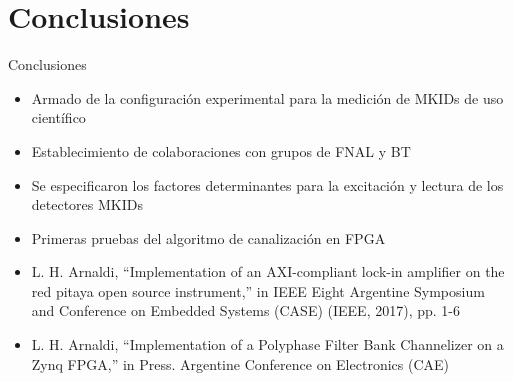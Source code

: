 \documentclass[ignorenonframetext,12pt]{beamer}
\begin{document}
%
%
\section{Conclusiones}
\begin{frame}{Conclusiones}
				\begin{itemize}
								\item Armado de la configuración experimental para la medición
												de MKIDs de uso científico
								\item Establecimiento de colaboraciones con grupos de FNAL y BT
								\item Se especificaron los factores determinantes para la
												excitación y lectura de los detectores MKIDs
								\item Primeras pruebas del algoritmo de canalización en FPGA
								\item L. H. Arnaldi, ``Implementation of an AXI-compliant
												lock-in amplifier on the red pitaya open source
												instrument,'' in IEEE Eight Argentine Symposium and
												Conference on Embedded Systems (CASE) (IEEE, 2017), pp.
												1-6
								\item L. H. Arnaldi, ``Implementation of a Polyphase Filter Bank
												Channelizer on a Zynq FPGA,'' in Press. Argentine
												Conference on Electronics (CAE)
				\end{itemize}
\end{frame}
\end{document}
